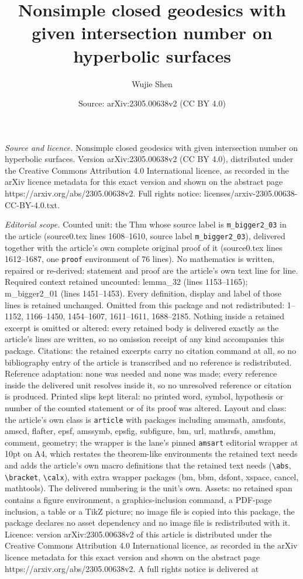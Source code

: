 \documentclass[10pt,a4paper]{amsart}
\title[Nonsimple closed geodesics with given intersection number on]{Nonsimple closed geodesics with given intersection number on hyperbolic surfaces}
\author{Wujie Shen}
\date{Source: arXiv:2305.00638v2 (CC BY 4.0)}
\begin{document}
\maketitle

\noindent\emph{Source and licence.} Nonsimple closed geodesics with given intersection number on hyperbolic surfaces. Version arXiv:2305.00638v2 (CC BY 4.0), distributed under the Creative Commons Attribution 4.0 International licence, as recorded in the arXiv licence metadata for this exact version and shown on the abstract page https://arxiv.org/abs/2305.00638v2. Full rights notice: licenses/arxiv-2305.00638-CC-BY-4.0.txt.\par\smallskip

\noindent\textit{Editorial scope.} Counted unit: the Thm whose source label is \texttt{m\_bigger2\_03} in the article (source0.tex lines 1608--1610, source label \texttt{m\_bigger2\_03}), delivered together with the article's own complete original proof of it (source0.tex lines 1612--1687, one \texttt{proof} environment of 76 lines). No mathematics is written, repaired or re-derived: statement and proof are the article's own text line for line. Required context retained uncounted: lemma\_32 (lines 1153--1165); m\_bigger2\_01 (lines 1451--1453). Every definition, display and label of those lines is retained unchanged. Omitted from this package and not redistributed: 1--1152, 1166--1450, 1454--1607, 1611--1611, 1688--2185. Nothing inside a retained excerpt is omitted or altered: every retained body is delivered exactly as the article's lines are written, so no omission receipt of any kind accompanies this package. Citations: the retained excerpts carry no citation command at all, so no bibliography entry of the article is transcribed and no reference is redistributed. Reference adaptation: none was needed and none was made; every reference inside the delivered unit resolves inside it, so no unresolved reference or citation is produced. Printed slips kept literal: no printed word, symbol, hypothesis or number of the counted statement or of its proof was altered. Layout and class: the article's own class is \texttt{article} with packages including amsmath, amsfonts, amscd, flafter, epsf, amssymb, epsfig, subfigure, bm, url, mathrsfs, amsthm, comment, geometry; the wrapper is the lane's pinned \texttt{amsart} editorial wrapper at 10pt on A4, which restates the theorem-like environments the retained text needs and adds the article's own macro definitions that the retained text needs (\texttt{\textbackslash abs}, \texttt{\textbackslash bracket}, \texttt{\textbackslash calx}), with extra wrapper packages (bm, bbm, dsfont, xspace, cancel, mathtools). The delivered numbering is the unit's own. Assets: no retained span contains a figure environment, a graphics-inclusion command, a PDF-page inclusion, a table or a TikZ picture; no image file is copied into this package, the package declares no asset dependency and no image file is redistributed with it. Licence: version arXiv:2305.00638v2 of this article is distributed under the Creative Commons Attribution 4.0 International licence, as recorded in the arXiv licence metadata for this exact version and shown on the abstract page https://arxiv.org/abs/2305.00638v2. A full rights notice is delivered at 
\end{document}
